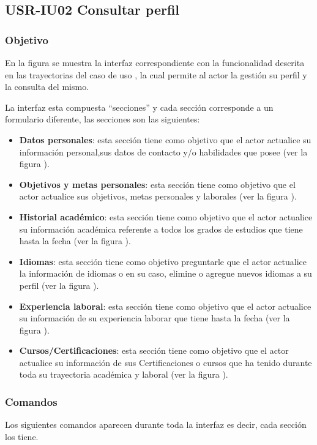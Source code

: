 \clearpage
\subsection{USR-IU02 Consultar perfil}

\subsubsection{Objetivo}
En la figura  se muestra la interfaz correspondiente con la funcionalidad descrita en las
trayectorias del caso de uso  , la cual permite al actor la gestión su perfil y la consulta del mismo.

La interfaz esta compuesta ``secciones'' y cada sección corresponde a un formulario diferente, las secciones
son las siguientes:
\begin{itemize}
   \item \textbf{Datos personales}: esta sección tiene como objetivo que el actor actualice su información
   personal,sus datos de contacto y/o habilidades que posee (ver la figura ).
   \item \textbf{Objetivos y metas personales}: esta sección tiene como objetivo que el actor actualice sus objetivos, metas personales y laborales 
   (ver la figura ).
   \item \textbf{Historial académico}: esta sección tiene como objetivo que el actor actualice su información
   académica referente a todos los grados de estudios que tiene hasta la fecha (ver la figura ).
   \item \textbf{Idiomas}: esta sección tiene como objetivo preguntarle que el actor actualice la información de idiomas o en su caso, elimine
   o agregue nuevos idiomas a su perfil  (ver la figura ).
   \item \textbf{Experiencia laboral}: esta sección tiene como objetivo que el actor actualice su información de su experiencia
   laborar que tiene hasta la fecha (ver la figura ).
   \item \textbf{Cursos/Certificaciones}:  esta sección tiene como objetivo que el actor actualice su información de sus Certificaciones
   o cursos que ha tenido durante toda su trayectoria académica y laboral (ver la figura ).
\end{itemize}

\subsubsection{Comandos}
Los siguientes comandos aparecen durante toda la interfaz es decir, cada sección los tiene.

